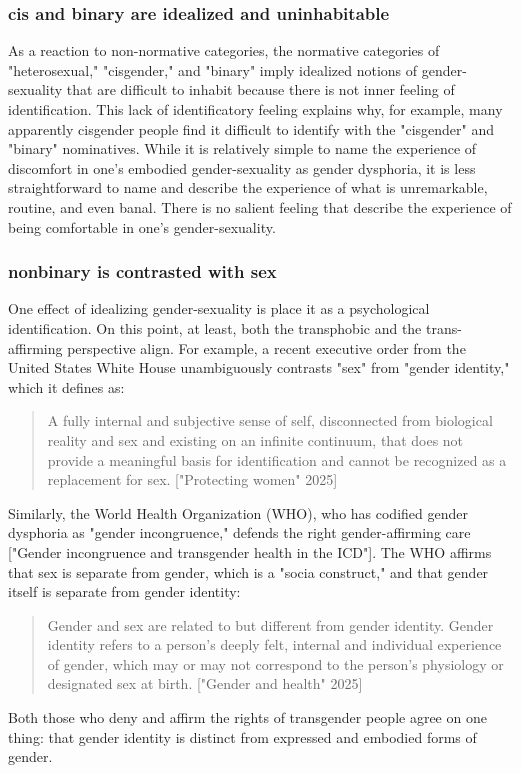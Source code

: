 \documentclass[11pt]{article}
\begin{document}
\subsubsection{cis and binary are idealized and uninhabitable}
\label{sec:org1e5680d}
As a reaction to non-normative categories, the normative categories of
"heterosexual," "cisgender," and "binary" imply idealized notions of
gender-sexuality that are difficult to inhabit because there is not
inner feeling of identification. This lack of identificatory feeling
explains why, for example, many apparently cisgender people find it
difficult to identify with the "cisgender" and "binary" nominatives.
While it is relatively simple to name the experience of discomfort in
one's embodied gender-sexuality as gender dysphoria, it is less
straightforward to name and describe the experience of what is
unremarkable, routine, and even banal. There is no salient feeling
that describe the experience of being comfortable in one's
gender-sexuality.

\subsubsection{nonbinary is contrasted with sex}
\label{sec:orgb90c248}
One effect of idealizing gender-sexuality is place it as a
psychological identification. On this point, at least, both the
transphobic and the trans-affirming perspective align. For example, a
recent executive order from the United States White House
unambiguously contrasts "sex" from "gender identity," which it defines
as:
\begin{quote}
A fully internal and subjective sense of self, disconnected from
biological reality and sex and existing on an infinite continuum, that
does not provide a meaningful basis for identification and cannot be
recognized as a replacement for sex. ["Protecting women" 2025]
\end{quote}
Similarly, the World Health Organization (WHO), who has codified
gender dysphoria as "gender incongruence," defends the right
gender-affirming care ["Gender incongruence and transgender health in
the ICD"]. The WHO affirms that sex is separate from gender, which is
a "socia construct," and that gender itself is separate from gender
identity:
\begin{quote}
Gender and sex are related to but different from gender identity.
Gender identity refers to a person’s deeply felt, internal and
individual experience of gender, which may or may not correspond to
the person’s physiology or designated sex at birth. ["Gender and
health" 2025]
\end{quote}
Both those who deny and affirm the rights of transgender people agree
on one thing: that gender identity is distinct from expressed and
embodied forms of gender.
\end{document}
